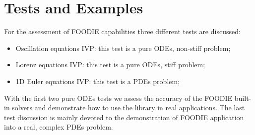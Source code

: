 \section{Tests and Examples}\label{sec:Tests}

For the assessment of FOODIE capabilities three different tests are discussed:

\begin{itemize}
  \item Oscillation equations IVP: this test is a pure ODEs, non-stiff problem;
  \item Lorenz equations IVP: this test is a pure ODEs, stiff problem;
  \item 1D Euler equations IVP: this test is a PDEs problem;
  \end{itemize}

With the first two pure ODEs tests we assess the accuracy of the FOODIE built-in solvers and demonstrate how to use the library in real applications. The last test discussion is mainly devoted to the demonstration of FOODIE application into a real, complex PDEs problem.


